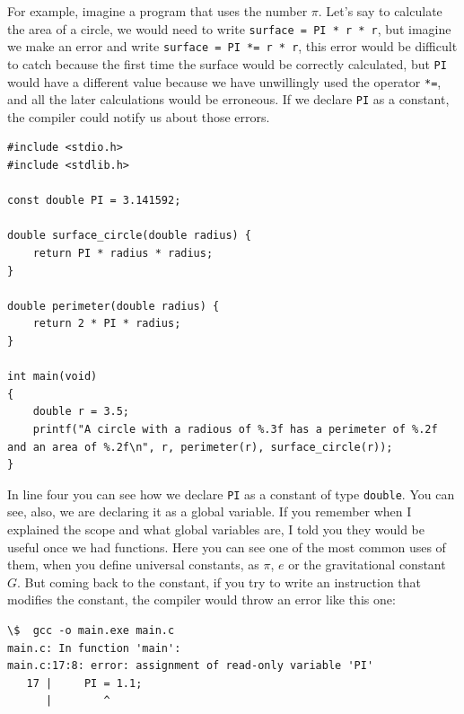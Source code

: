 \documentclass[a4paper]{article}
\begin{document}
For example, imagine a program that uses the number $\pi$. Let's say to
calculate the area of a circle, we would need to write
\verb!surface = PI * r * r!, but imagine we make an error and write
\verb!surface = PI *= r * r!, this error would be difficult to catch because
the first time the surface would be correctly calculated, but \verb!PI! would
have a different value because we have unwillingly used the operator \verb!*=!,
and all the later calculations would be erroneous. If we declare \verb!PI! as
a constant, the compiler could notify us about those errors.

\noindent
\begin{minipage}[H]{\linewidth}
\mbox{}
\begin{lstlisting}[style=C,
caption={Uso de una constante numérica},
label={lst:constantUsage}]
#include <stdio.h>
#include <stdlib.h>

const double PI = 3.141592;

double surface_circle(double radius) {
    return PI * radius * radius;
}

double perimeter(double radius) {
    return 2 * PI * radius;
}

int main(void)
{
    double r = 3.5;
    printf("A circle with a radious of %.3f has a perimeter of %.2f and an area of %.2f\n", r, perimeter(r), surface_circle(r));
}
\end{lstlisting}
\end{minipage}

In line four you can see how we declare \verb!PI! as a constant of type
\verb!double!. You can see, also, we are declaring it as a global variable. If
you remember when I explained the scope and what global variables are, I told
you they would be useful once we had functions. Here you can see one of the most
common uses of them, when you define universal constants, as $\pi$, $e$ or the
gravitational constant $G$. But coming back to the constant, if you try to write
an instruction that modifies the constant, the compiler would throw an error
like this one:

\noindent
\begin{minipage}[H]{\linewidth}
\mbox{}
\begin{lstlisting}[style=terminalStyle]
\$  gcc -o main.exe main.c
main.c: In function 'main':
main.c:17:8: error: assignment of read-only variable 'PI'
   17 |     PI = 1.1;
      |        ^
\end{lstlisting}
\end{minipage}
\end{document}
